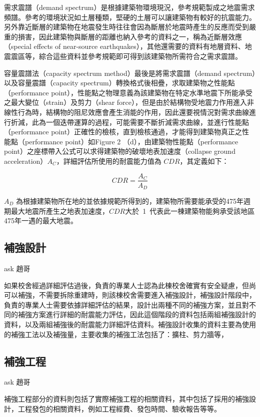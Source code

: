需求震譜（demand spectrum）是根據建築物環境現況，參考規範製成之地震需求頻譜。參考的環境狀況如土層種類，堅硬的土層可以讓建築物有較好的抗震能力。另外靠近斷層的建築物在地震發生時往往會因為斷層於地震時產生的反應而受到嚴重的損害，因此建築物與斷層的距離也納入參考的資料之一，稱為近斷層效應（special effects of near-source earthquakes），其他還需要的資料有地層資料、地震震區等，綜合這些資料並參考規範即可得到該建築物所需符合之需求震譜。

容量震譜法（capacity spectrum method）最後是將需求震譜（demand spectrum）以及容量震譜（capacity spectrum）轉換格式後相疊，求取建築物之性能點（performance point），性能點之物理意義為該建築物在特定水準地震下所能承受之最大變位（strain）及剪力（shear force），但是由於結構物受地震力作用進入非線性行為時，結構物的阻尼效應會產生消能的作用，因此還要視情況對需求曲線進行折減，此為一個迭帶運算的過程，可能需要不斷折減需求曲線，並進行性能點（performance point）正確性的檢核，直到檢核通過，才能得到建築物真正之性能點（performance point）如Figure 2 （d），由建築物性能點（performance point）之座標帶入公式可以求得建築物的破壞地表加速度（collapse ground acceleration）$A_C$，詳細評估所使用的耐震能力值為 $CDR$，其定義如下：

\begin{equation} CDR = \dfrac{A_C}{A_D} \label{eq:CDR}\end{equation} 

$A_D$ 為根據建築物所在地的並依據規範所得到的，建築物所需要能承受的475年週期最大地震所產生之地表加速度，$CDR$大於~1~代表此一棟建築物能夠承受該地區475年一遇的最大地震。

\subsection{補強設計}

ask 趙哥

如果校舍經過詳細評估過後，負責的專業人士認為此棟校舍確實有安全疑慮，但尚可以補強，不需要拆除重建時，則該棟校舍需要進入補強設計，補強設計階段中，負責的專業人士需要依據詳細評估的結果，設計出兩種不同的補強方案，並且對不同的補強方案進行詳細的耐震能力評估，因此這個階段的資料包括兩組補強設計的資料，以及兩組補強後的耐震能力詳細評估資料。補強設計收集的資料主要為使用的補強工法以及補強量，主要收集的補強工法包括了：擴柱、剪力牆等，

\subsection{補強工程}

ask 趙哥

補強工程部分的資料則包括了實際補強工程的相關資料，其中包括了採用的補強設計，工程發包的相關資料，例如工程經費、發包時間、驗收報告等等。